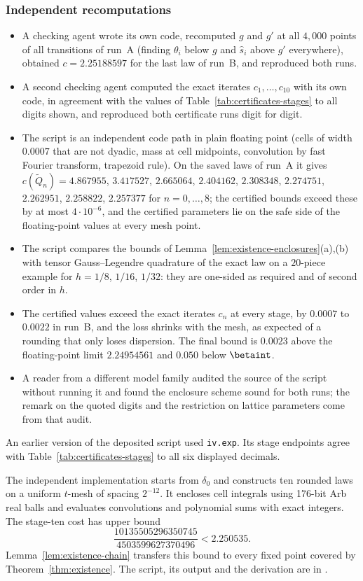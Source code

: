 \subsubsection*{Independent recomputations}
\begin{itemize}
\item A checking agent wrote its own code, recomputed $g$ and $g'$ at all $4{,}000$ points of
all transitions of run~A (finding $\theta_i$ below $g$ and $\hat s_i$ above $g'$ everywhere),
obtained $c=2.25188597$ for the last law of run~B, and reproduced both runs.
\item A second checking agent computed the exact iterates $c_1,\dots,c_{10}$ with its own
code, in agreement with the values of Table~\ref{tab:certificates-stages} to all digits
shown, and reproduced both certificate runs digit for digit.
\item The script  is an independent code path in plain floating point
(cells of width $0.0007$ that are not dyadic, mass at cell midpoints, convolution by fast
Fourier transform, trapezoid rule). On the saved laws of run~A it gives
$c(\tilde Q_n)=4.867955$, $3.417527$, $2.665064$, $2.404162$, $2.308348$, $2.274751$,
$2.262951$, $2.258822$, $2.257377$ for $n=0,\dots,8$; the certified bounds exceed these by at
most $4\cdot10^{-6}$, and the certified parameters lie on the safe side of the floating-point
values at every mesh point.
\item The script  compares the bounds of
Lemma~\ref{lem:existence-enclosures}(a),(b) with tensor
Gauss--Legendre quadrature of the exact law on a $20$-piece example for $h=1/8$, $1/16$,
$1/32$: they are one-sided as required and of second order in $h$.
\item The certified values exceed the exact iterates $c_n$ at every stage, by $0.0007$ to
$0.0022$ in run~B, and the loss shrinks with the mesh, as expected of a rounding that only
loses dispersion. The final bound is $0.0023$ above the floating-point limit $2.24954561$ and
$0.050$ below $\betaint$.
\item A reader from a different model family audited the source of the script without
running it and found the enclosure scheme sound for both runs; the remark on the quoted
digits and the restriction on lattice parameters come from that audit.
\end{itemize}
An earlier version of the deposited script used \texttt{iv.exp}. Its stage endpoints agree with
Table~\ref{tab:certificates-stages} to all six displayed decimals.

The independent implementation  starts from
$\delta_0$ and constructs ten rounded laws on a uniform $t$-mesh of spacing $2^{-12}$.
It encloses cell integrals using 176-bit Arb real balls and evaluates convolutions
and polynomial sums with exact integers. The stage-ten cost has upper bound
\[
  \frac{10135505296350745}{4503599627370496}<2.250535 .
\]
Lemma~\ref{lem:existence-chain} transfers this bound to every fixed point covered by
Theorem~\ref{thm:existence}. The script, its output and the derivation are in
.
